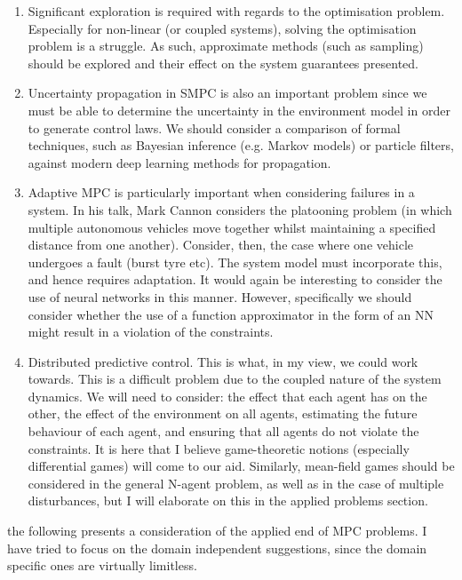 \documentclass[preprint,11pt]{report}
\begin{document}
\begin{enumerate}
	\item Significant exploration is required with regards to the optimisation problem. Especially
	for non-linear (or coupled systems), solving the optimisation problem is a struggle. As such,
	approximate methods (such as sampling) should be explored and their effect on the system
	guarantees presented.
	\item Uncertainty propagation in SMPC is also an important problem since we must be able to
	determine the uncertainty in the environment model in order to generate control laws. We should
	consider a comparison of formal techniques, such as Bayesian inference (e.g. Markov models) or
	particle filters, against modern deep learning methods for propagation.
	\item Adaptive MPC is particularly important when considering failures in a system. In his talk,
	Mark Cannon considers the platooning problem (in which multiple autonomous vehicles move
	together whilst maintaining a specified distance from one another). Consider, then, the case
	where one vehicle undergoes a fault (burst tyre etc). The system model must incorporate this,
	and hence requires adaptation. It would again be interesting to consider the use of neural
	networks in this manner. However, specifically we should consider whether the use of a function
	approximator in the form of an NN might result in a violation of the constraints.
	\item Distributed predictive control. This is what, in my view, we could work towards. This is a
	difficult problem due to the coupled nature of the system dynamics. We will need to consider: the
	effect that each agent has on the other, the effect of the environment on all agents, estimating the
	future behaviour of each agent, and ensuring that all agents do not violate the constraints. It is
	here that I believe game-theoretic notions (especially differential games) will come to our
	aid. Similarly, mean-field games should be considered in the general N-agent problem, as well as
	in the case of multiple disturbances, but I will elaborate on this in the applied problems
	section.
\end{enumerate}

the following presents a consideration of the applied end of MPC problems. I have tried to focus on
the domain independent suggestions, since the domain specific ones are virtually limitless.
\end{document}

